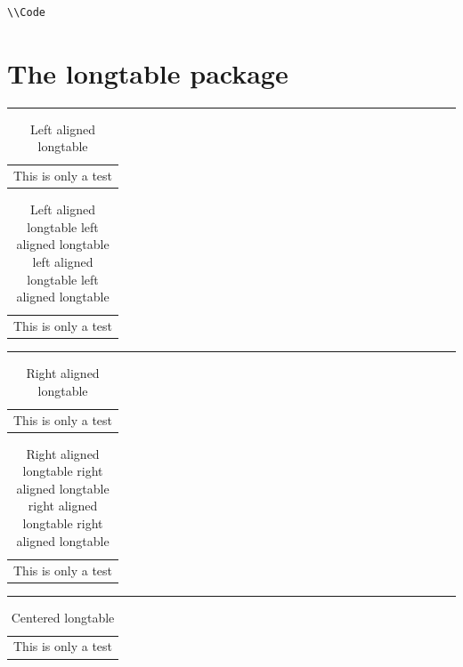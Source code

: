    \begin{lstlisting}[float=htb, caption={Messung der Ausfuehrungszeit}, label=list:ZeitMarkert]
     \\Code
   \end{lstlisting}

\fi

\ifx\longtable\undefined \else
\clearpage
\section{The longtable package}

\noindent\rule{\textwidth}{1pt}%

\begin{longtable}[l]{l}
\caption{Left aligned longtable}\label{longtable.1}\\
This is only a test\\
\end{longtable}

\begin{longtable}[l]{l}
\caption[Left aligned longtable (2)]%
        {Left aligned longtable left aligned longtable
         left aligned longtable left aligned longtable}\label{longtable.2}\\
This is only a test\\
\end{longtable}

\noindent\rule{\textwidth}{1pt}%

\begin{longtable}[r]{l}
\caption{Right aligned longtable}\label{longtable.3}\\
This is only a test\\
\end{longtable}

\begin{longtable}[r]{l}
\caption[Right aligned longtable (2)]%
        {Right aligned longtable right aligned longtable
         right aligned longtable right aligned longtable}\label{longtable.4}\\
This is only a test\\
\end{longtable}

\noindent\rule{\textwidth}{1pt}%

\begin{longtable}[c]{l}
\caption{Centered longtable}\label{longtable.5}\\
This is only a test\\
\end{longtable}

